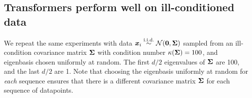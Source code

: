 
\vspace{-1mm}
\subsection{Transformers perform well on ill-conditioned data}  \label{ssec:ill}
\vspace{-1mm}

\vspace{-1mm}


We repeat the same experiments with data $\boldsymbol{x}_i \overset{\text{i.i.d.}}{\sim} \mathcal N(\boldsymbol{0}, \boldsymbol{\Sigma})$ sampled from an ill-condition covariance matrix $\boldsymbol{\Sigma}$ with condition number $\kappa(\boldsymbol{\Sigma}) = 100$, and eigenbasis chosen uniformly at random.  The first $d/2$ eigenvalues of $\boldsymbol{\Sigma}$  are 100, and the last $d/2$ are 1. Note that choosing the eigenbasis uniformly at random for \emph{each} sequence ensures that there is a different covariance matrix $\boldsymbol{\Sigma}$ for {each} sequence of datapoints.

